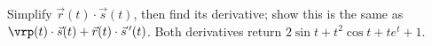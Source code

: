 {Simplify $\vec r(t)\cdot\vec s(t)$, then find its derivative; show this is the same as $\vrp(t)\cdot\vec s(t) + \vec r(t)\cdot\vec s\,'(t)$.
}
{
Both derivatives return $2\sin t+t^2\cos t + te^t+1$.
}

